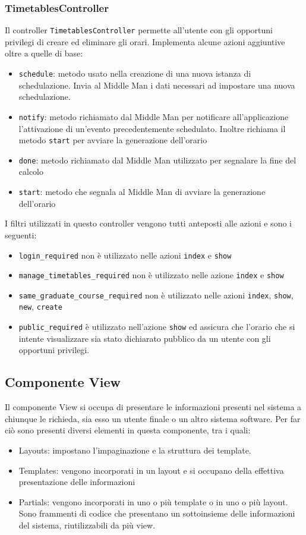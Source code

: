\documentclass[11pt,a4paper]{article}
\begin{document}
\subsubsection{TimetablesController}
Il controller \verb|TimetablesController| permette all'utente con gli opportuni privilegi di creare ed eliminare gli orari.
Implementa alcune azioni aggiuntive oltre a quelle di base:
\begin{itemize}
\item \verb|schedule|: metodo usato nella creazione di una nuova istanza di schedulazione. Invia al Middle Man i dati necessari ad impostare una nuova schedulazione.
\item \verb|notify|: metodo richiamato dal Middle Man per notificare all'applicazione l'attivazione di un'evento precedentemente schedulato. Inoltre richiama il metodo \verb|start| per avviare la generazione dell'orario
\item \verb|done|: metodo richiamato dal Middle Man utilizzato per segnalare la fine del calcolo
\item \verb|start|: metodo che segnala al Middle Man di avviare la generazione dell'orario
\end{itemize}
I filtri utilizzati in questo controller vengono tutti anteposti alle azioni e sono i seguenti:
\begin{itemize}
 \item \verb|login_required| non è utilizzato nelle azioni \verb|index| e \verb|show|
 \item \verb|manage_timetables_required| non è utilizzato nelle azione \verb|index| e \verb|show|
 \item \verb|same_graduate_course_required| non è utilizzato nelle azioni \verb|index|, \verb|show|, \verb|new|, \verb|create|
 \item \verb|public_required| è utilizzato nell'azione \verb|show| ed assicura che l'orario che si intente visualizzare sia stato dichiarato pubblico da un utente con gli opportuni privilegi.
\end{itemize}
\subsection{Componente View}
Il componente View si occupa di presentare le informazioni presenti nel sistema a chiunque le richieda, sia esso un utente finale o un altro sistema software. Per far ciò sono presenti diversi elementi in questa componente, tra i quali:
\begin{itemize}
 \item Layouts: impostano l'impaginazione e la struttura dei template.
 \item Templates: vengono incorporati in un layout e si occupano della effettiva presentazione delle informazioni
 \item Partials: vengono incorporati in uno o più template o in uno o più layout. Sono frammenti di codice che presentano un sottoinsieme delle informazioni del sistema, riutilizzabili da più view.
\end{itemize}
\end{document}
